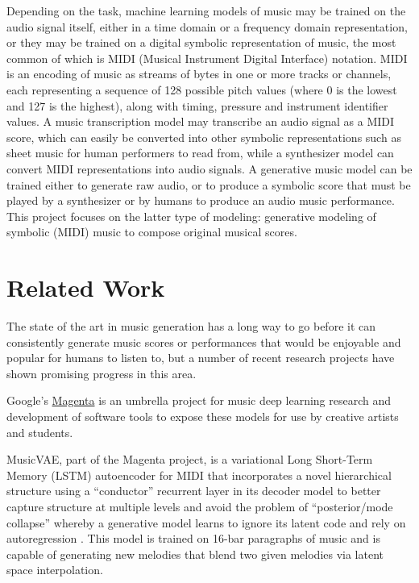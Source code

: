\documentclass[sigconf,authorversion]{acmart}
\begin{document}
Depending on the task, machine learning models of music may be trained
on the audio signal itself, either in a time domain or a frequency
domain representation, or they may be trained on a digital symbolic
representation of music, the most common of which is MIDI (Musical
Instrument Digital Interface) notation. MIDI is an encoding of music
as streams of bytes in one or more tracks or channels, each
representing a sequence of 128 possible pitch values (where 0 is the
lowest and 127 is the highest), along with timing, pressure and
instrument identifier values. A music transcription model may
transcribe an audio signal as a MIDI score, which can easily be
converted into other symbolic representations such as sheet music for
human performers to read from, while a synthesizer model can convert
MIDI representations into audio signals. A generative music model can
be trained either to generate raw audio, or to produce a symbolic
score that must be played by a synthesizer or by humans to produce an
audio music performance. This project focuses on the latter type of
modeling: generative modeling of symbolic (MIDI) music to compose
original musical scores.

\section{Related Work}

The state of the art in music generation has a long way to go before
it can consistently generate music scores or performances that would
be enjoyable and popular for humans to listen to, but a number of
recent research projects have shown promising progress in this area.

Google's \href{https://magenta.tensorflow.org/}{Magenta} is an
umbrella project for music deep learning research and development of
software tools to expose these models for use by creative artists and
students.

MusicVAE, part of the Magenta project, is a variational Long
Short-Term Memory (LSTM) autoencoder for MIDI that incorporates a
novel hierarchical structure using a ``conductor'' recurrent layer in
its decoder model to better capture structure at multiple levels and
avoid the problem of ``posterior/mode collapse'' whereby a generative
model learns to ignore its latent code and rely on autoregression
\cite{roberts_hierarchical_2018}. This model is trained on 16-bar
paragraphs of music and is capable of generating new melodies that
blend two given melodies via latent space interpolation.
\end{document}
